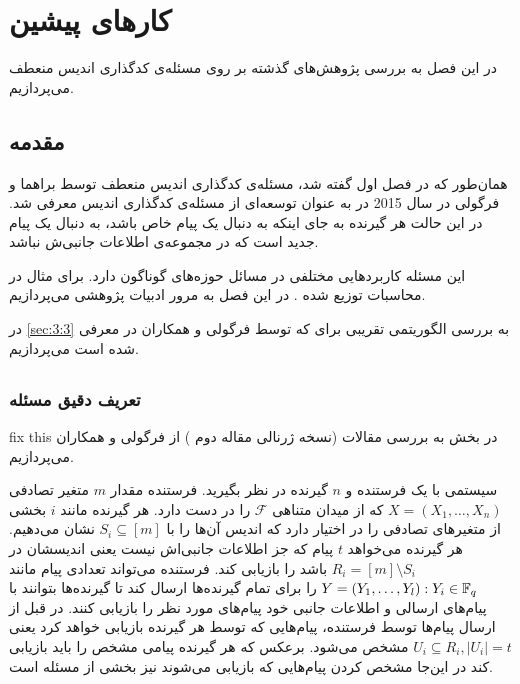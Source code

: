 \chapter{کارهای پیشین}
\label{chapter:literature}

در این فصل به بررسی پژوهش‌های گذشته بر روی مسئله‌ی کدگذاری اندیس منعطف می‌پردازیم.

\section{مقدمه}
همان‌طور که در فصل اول گفته شد، مسئله‌ی کدگذاری اندیس منعطف توسط براهما و فرگولی در سال 2015 در
\cite{pliablefirstpaper}
به عنوان توسعه‌ای از مسئله‌ی کدگذاری اندیس معرفی شد. در این حالت هر گیرنده به جای اینکه به دنبال یک پیام خاص باشد، به دنبال یک پیام جدید است که در مجموعه‌ی اطلاعات جانبی‌ش نباشد.

این مسئله کاربردهایی مختلفی در مسائل حوزه‌های گوناگون دارد. برای مثال در محاسبات توزیع شده
\cite{datashuf}
\cite{8404065}
\cite{8682270}.
در این فصل به مرور ادبیات پژوهشی 
\picod
می‌پردازیم.

در 
\autoref{sec:3:3}
به بررسی الگوریتمی تقریبی برای 
\picod
که توسط فرگولی و همکاران در
\cite{song2017polynomialtime}
معرفی شده است می‌پردازیم.

\section{
\picod
}
\subsection{تعریف دقیق مسئله}
\label{sec:3:3}
fix this
در بخش به بررسی مقالات
\cite{pliablefirstpaper,6620405, pliable2015paper,  song2017polynomialtime}
(نسخه ژرنالی مقاله دوم
\cite{7541273}
) از فرگولی و همکاران می‌پردازیم. 

	سیستمی با یک فرستنده و 
	$n$
	گیرنده در نظر بگیرید. فرستنده مقدار
	$m$
	متغیر تصادفی
	$X = (X_1, \ldots, X_n)$
	که از میدان متناهی
	$\mathcal{F}$
	را در دست دارد. هر گیرنده مانند 
	$i$
	بخشی از متغیرهای تصادفی را در اختیار دارد که اندیس آن‌ها را با 
	$S_i \subseteq [m]$
	نشان می‌دهیم. هر گیرنده می‌خواهد 
	$t$
	پیام که جز اطلاعات جانبی‌اش نیست یعنی اندیسشان در
	$R_i = [m] \setminus S_i$
	باشد را بازیابی کند.
	فرستنده می‌تواند تعدادی پیام مانند
	$Y = (Y_1, \ldots, Y_l): Y_i \in {\mathbb{F}_q}$
	را برای تمام گیرنده‌ها ارسال کند تا گیرنده‌ها بتوانند با پیام‌های ارسالی و اطلاعات جانبی خود پیام‌های مورد نظر را بازیابی کنند. در
	\picod
	قبل از ارسال پیام‌ها توسط فرستنده، پیام‌هایی که توسط هر گیرنده بازیابی خواهد کرد یعنی
	$U_i \subseteq R_i,  |U_i| = t$
	 مشخص می‌شود. برعکس 
	\icod
	 که هر گیرنده پیامی مشخص را باید بازیابی کند در این‌جا مشخص کردن پیام‌هایی که بازیابی می‌شوند نیز بخشی از مسئله است.
	 
